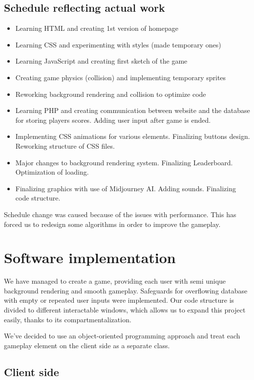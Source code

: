 \documentclass[oneside,a4paper,11pt]{report}
\begin{document}
\section{Schedule reflecting actual work}
\begin{itemize}
	\item Learning HTML and creating 1st version of homepage
	\item Learning CSS and experimenting with styles (made temporary ones)
	\item Learning JavaScript and creating first sketch of the game
	\item Creating game physics (collision) and implementing temporary sprites
	\item Reworking background rendering and collision to optimize code
	\item Learning PHP and creating communication between website and the database for storing players scores. Adding user input after game is ended.
	\item Implementing CSS animations for various elements. Finalizing buttons design. Reworking structure of CSS files.
	\item Major changes to background rendering system. Finalizing Leaderboard. Optimization of loading.
	\item Finalizing graphics with use of Midjourney AI\cite{Midjourney}. Adding sounds. Finalizing code structure.
\end{itemize}

\noindent
Schedule change was caused because of the issues with performance. This has forced us to redesign some algorithms in order to improve the gameplay.

\chapter{Software implementation}

We have managed to create a game, providing each user with semi unique background rendering and smooth gameplay.
Safeguards for overflowing database with empty or repeated user inputs were implemented.
Our code structure is divided to different interactable windows, which allows us to expand this project easily, thanks to its compartmentalization.

\par
We've decided to use an object-oriented programming approach and treat each gameplay element on the client side as a separate class.

\section{Client side}
\end{document}
